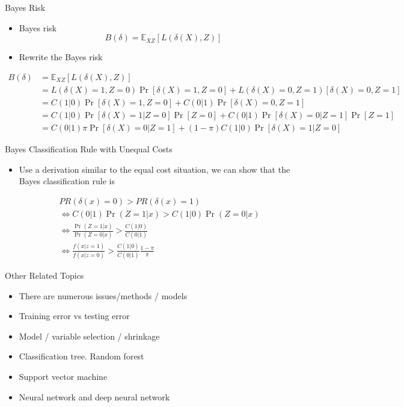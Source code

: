 \documentclass[
  ignorenonframetext,
]{beamer}
\providecommand{\tightlist}{%
  \setlength{\itemsep}{0pt}\setlength{\parskip}{0pt}}
\begin{document}
\begin{frame}{Bayes Risk}
\protect\hypertarget{bayes-risk-1}{}
\begin{itemize}
\tightlist
\item
  Bayes risk \[B(\delta)=\mathbb E_{XZ} [L(\delta(X), Z)]\]
\item
  Rewrite the Bayes risk
\end{itemize}

\tiny

\[\begin{aligned}
B(\delta) &=\mathbb E_{XZ} [L(\delta(X), Z)]\\
&=L(\delta(X)=1, Z=0)\Pr[\delta(X)=1, Z=0] + L(\delta(X)=0, Z=1)[\delta(X)=0, Z=1]\\
&=C(1|0)\Pr [\delta(X)=1, Z=0] + C(0|1)\Pr [\delta(X)=0, Z=1]\\
&=C(1|0)\Pr [\delta(X)=1| Z=0]\Pr[Z=0] + C(0|1)\Pr [\delta(X)=0| Z=1] \Pr[Z=1]\\
&=C(0|1)\pi \Pr [\delta(X)=0| Z=1]+ (1-\pi)C(1|0)\Pr [\delta(X)=1| Z=0]
\end{aligned}\] \normalsize
\end{frame}

\begin{frame}{Bayes Classification Rule with Unequal Costs}
\protect\hypertarget{bayes-classification-rule-with-unequal-costs}{}
\begin{itemize}
\tightlist
\item
  Use a derivation similar to the equal cost situation, we can show that
  the Bayes classification rule is
\end{itemize}

\[\begin{aligned}
&PR(\delta(x)=0)>PR(\delta(x)=1) \\
&\Leftrightarrow C(0|1)\Pr(Z=1|x)> C(1|0)\Pr(Z=0|x)\\
&\Leftrightarrow \frac{\Pr(Z=1|x)}{\Pr(Z=0|x)}>\frac{C(1|0)}{C(0|1)}\\
&\Leftrightarrow \frac{f(x|z=1)}{f(x|z=0)}>\frac{C(1|0)}{C(0|1)}\frac{1-\pi}{\pi}
\end{aligned}\]
\end{frame}

\begin{frame}{Other Related Topics}
\protect\hypertarget{other-related-topics}{}
\begin{itemize}
\tightlist
\item
  There are numerous issues/methods / models
\item
  Training error vs testing error
\item
  Model / variable selection / shrinkage
\item
  Classification tree. Random forest
\item
  Support vector machine
\item
  Neural network and deep neural network
\end{itemize}
\end{frame}
\end{document}
